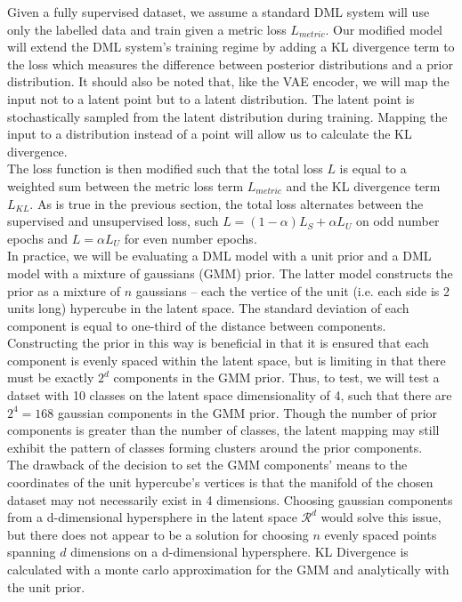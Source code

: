 \documentclass[./dissertation.tex]{subfiles}
\begin{document}
    Given a fully supervised dataset, we assume a standard DML system will use only the labelled data and train given a metric loss $L_{metric}$. Our modified model will extend the DML system's training regime by adding a KL divergence term to the loss which measures the difference between posterior distributions and a prior distribution. It should also be noted that, like the VAE encoder, we will map the input not to a latent point but to a latent distribution. The latent point is stochastically sampled from the latent distribution during training. Mapping the input to a distribution instead of a point will allow us to calculate the KL divergence. \\
    
    The loss function is then modified such that the total loss $L$ is equal to a weighted sum between the metric loss term $L_{metric}$ and the KL divergence term $L_{KL}$. As is true in the previous section, the total loss alternates between the supervised and unsupervised loss, such $L = (1 - \alpha) L_{S} + \alpha L_{U}$ on odd number epochs and $L = \alpha L_{U}$ for even number epochs. \\
    
    In practice, we will be evaluating a DML model with a unit prior and a DML model with a mixture of gaussians (GMM) prior. The latter model constructs the prior as a mixture of $n$ gaussians -- each the vertice of the unit (i.e. each side is 2 units long) hypercube in the latent space. The standard deviation of each component is equal to one-third of the distance between components. Constructing the prior in this way is beneficial in that it is ensured that each component is evenly spaced within the latent space, but is limiting in that there must be exactly $2^{d}$ components in the GMM prior. Thus, to test, we will test a datset with 10 classes on the latent space dimensionality of 4, such that there are $2^{4} = 168$ gaussian components in the GMM prior. Though the number of prior components is greater than the number of classes, the latent mapping may still exhibit the pattern of classes forming clusters around the prior components. \\
    
    The drawback of the decision to set the GMM components' means to the coordinates of the unit hypercube's vertices is that the manifold of the chosen dataset may not necessarily exist in 4 dimensions. Choosing gaussian components from a d-dimensional hypersphere in the latent space $\mathcal{R}^{d}$ would solve this issue, but there does not appear to be a solution for choosing $n$ evenly spaced points spanning $d$ dimensions on a d-dimensional hypersphere. KL Divergence is calculated with a monte carlo approximation for the GMM and analytically with the unit prior.
    
\end{document}
